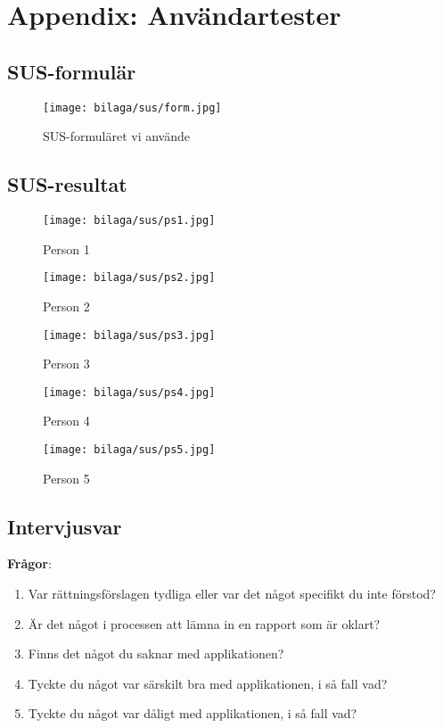 \appendix

\section{Appendix: Användartester}

\subsection{SUS-formulär}

\begin{figure}[H]
  \centering
  \texttt{[image: bilaga/sus/form.jpg]}
  \caption{SUS-formuläret vi använde}
\end{figure}

\subsection{SUS-resultat}

\begin{figure}[H]
  \centering
  \texttt{[image: bilaga/sus/ps1.jpg]}
  \caption{Person 1}
\end{figure}

\begin{figure}[H]
  \centering
  \texttt{[image: bilaga/sus/ps2.jpg]}
  \caption{Person 2}
\end{figure}

\begin{figure}[H]
  \centering
  \texttt{[image: bilaga/sus/ps3.jpg]}
  \caption{Person 3}
\end{figure}

\begin{figure}[H]
  \centering
  \texttt{[image: bilaga/sus/ps4.jpg]}
  \caption{Person 4}
\end{figure}

\begin{figure}[H]
  \centering
  \texttt{[image: bilaga/sus/ps5.jpg]}
  \caption{Person 5}
\end{figure}

\subsection{Intervjusvar}

\textbf{Frågor}:
\begin{enumerate}
\item Var rättningsförslagen tydliga eller var det något specifikt du inte förstod?
\item Är det något i processen att lämna in en rapport som är oklart?
\item Finns det något du saknar med applikationen?
\item Tyckte du något var särskilt bra med applikationen, i så fall vad?
\item Tyckte du något var dåligt med applikationen, i så fall vad?
\end{enumerate}

